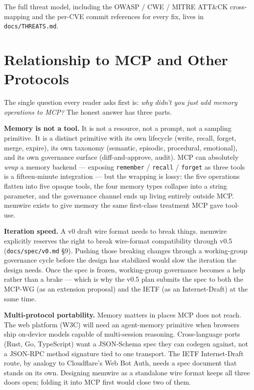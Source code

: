 \documentclass[11pt,letterpaper,twocolumn]{article}
\begin{document}
The full threat model, including the OWASP / CWE / MITRE ATT\&CK cross-mapping and the per-CVE commit references for every fix, lives in \texttt{docs/THREATS.md}.

\section{Relationship to MCP and Other Protocols}
\label{sec:mcp}

The single question every reader asks first is: \emph{why didn't you just add memory operations to MCP?} The honest answer has three parts.

\textbf{Memory is not a tool.} It is not a resource, not a prompt, not a sampling primitive. It is a distinct primitive with its own lifecycle (write, recall, forget, merge, expire), its own taxonomy (semantic, episodic, procedural, emotional), and its own governance surface (diff-and-approve, audit). MCP can absolutely \emph{wrap} a memory backend --- exposing \texttt{remember} / \texttt{recall} / \texttt{forget} as three tools is a fifteen-minute integration --- but the wrapping is lossy: the five operations flatten into five opaque tools, the four memory types collapse into a string parameter, and the governance channel ends up living entirely outside MCP. memwire exists to give memory the same first-class treatment MCP gave tool-use.

\textbf{Iteration speed.} A v0 draft wire format needs to break things. memwire explicitly reserves the right to break wire-format compatibility through v0.5 (\texttt{docs/spec/v0.md} \S9). Pushing those breaking changes through a working-group governance cycle before the design has stabilized would slow the iteration the design needs. Once the spec is frozen, working-group governance becomes a help rather than a brake --- which is why the v0.5 plan submits the spec to both the MCP-WG (as an extension proposal) and the IETF (as an Internet-Draft) at the same time.

\textbf{Multi-protocol portability.} Memory matters in places MCP does not reach. The web platform (W3C) will need an agent-memory primitive when browsers ship on-device models capable of multi-session reasoning. Cross-language ports (Rust, Go, TypeScript) want a JSON-Schema spec they can codegen against, not a JSON-RPC method signature tied to one transport. The IETF Internet-Draft route, by analogy to Cloudflare's Web Bot Auth, needs a spec document that stands on its own. Designing memwire as a standalone wire format keeps all three doors open; folding it into MCP first would close two of them.
\end{document}
